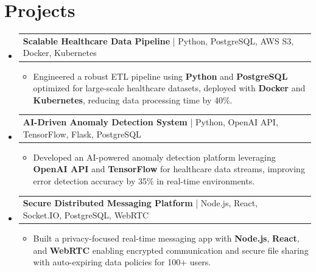 \documentclass[letterpaper,10pt]{article}
\makeatletter
\newcommand{\resumeItem}[1]{
  \item{\fontsize{8pt}{9pt}\selectfont
    #1 \vspace{-3pt}
  }
}
\newcommand{\resumeProjectHeading}[2]{
    \item
    \begin{tabular*}{1.001\textwidth}{l@{\extracolsep{\fill}}r}
      \fontsize{8.5pt}{10pt}#1 & \textbf{\fontsize{8.5pt}{10pt} #2}\\
    \end{tabular*}\vspace{-7pt}
}
\newcommand{\resumeSubHeadingListStart}{\begin{itemize}[leftmargin=0pt, label={}]}
\newcommand{\resumeSubHeadingListEnd}{\end{itemize}}
\newcommand{\resumeItemListStart}{\begin{itemize}[leftmargin=*]}
\newcommand{\resumeItemListEnd}{\end{itemize}\vspace{-5pt}}
\makeatother
\begin{document}
\section{Projects}
    \vspace{-5pt}
    \resumeSubHeadingListStart
          \resumeProjectHeading
            {\textbf{Scalable Healthcare Data Pipeline} | Python, PostgreSQL, AWS S3, Docker, Kubernetes}{}
            \resumeItemListStart
                \resumeItem{Engineered a robust ETL pipeline using \textbf{Python} and \textbf{PostgreSQL} optimized for large-scale healthcare datasets, deployed with \textbf{Docker} and \textbf{Kubernetes}, reducing data processing time by 40\%.}
            \resumeItemListEnd
        \vspace{-12pt}
    
        \resumeProjectHeading
            {\textbf{AI-Driven Anomaly Detection System} | Python, OpenAI API, TensorFlow, Flask, PostgreSQL}{}
        \resumeItemListStart
                \resumeItem{Developed an AI-powered anomaly detection platform leveraging \textbf{OpenAI API} and \textbf{TensorFlow} for healthcare data streams, improving error detection accuracy by 35\% in real-time environments.}
        \resumeItemListEnd
      \vspace{-12pt}
      \resumeProjectHeading
        {\textbf{Secure Distributed Messaging Platform} | Node.js, React, Socket.IO, PostgreSQL, WebRTC}{}
    \resumeItemListStart
            \resumeItem{Built a privacy-focused real-time messaging app with \textbf{Node.js}, \textbf{React}, and \textbf{WebRTC} enabling encrypted communication and secure file sharing with auto-expiring data policies for 100+ users.}
    \resumeItemListEnd
    \resumeSubHeadingListEnd
\end{document}
